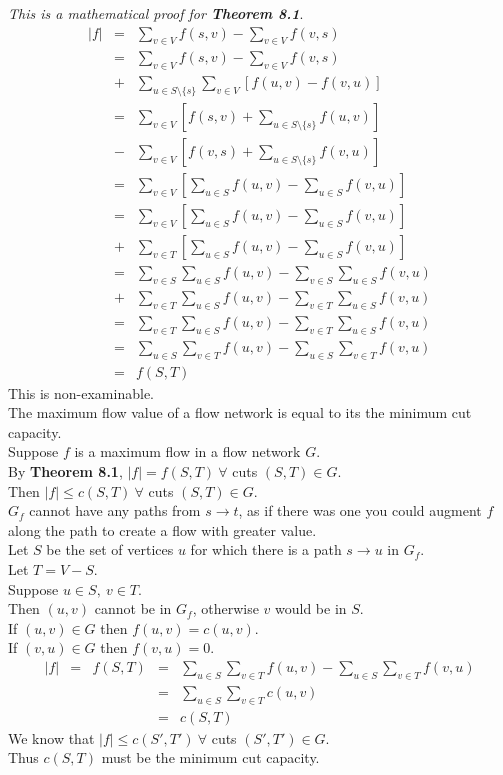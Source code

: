 \documentclass[11pt,a4paper]{article}
\begin{document}
\textit{This is a mathematical proof for \textbf{Theorem 8.1}}.
\[\begin{array}{rcl}
|f|&=&\sum_{v\in V}f(s,v)-\sum_{v\in V}f(v,s)\\
&=&\sum_{v\in V}f(s,v)-\sum_{v\in V}f(v,s)\\
&+&\sum_{u\in S\setminus\{s\}}\sum_{v\in V}[f(u,v)-f(v,u)]\\
&=&\sum_{v\in V}[f(s,v)+\sum_{u\in S\setminus\{s\}}f(u,v)]\\
&-&\sum_{v\in V}[f(v,s)+\sum_{u\in S\setminus\{s\}}f(v,u)]\\
&=&\sum_{v\in V}[\sum_{u\in S}f(u,v)-\sum_{u\in S}f(v,u)]\\
&=&\sum_{v\in V}[\sum_{u\in S}f(u,v)-\sum_{u\in S}f(v,u)]\\
&+&\sum_{v\in T}[\sum_{u\in S}f(u,v)-\sum_{u\in S}f(v,u)]\\
&=&\sum_{v\in S}\sum_{u\in S}f(u,v)-\sum_{v\in S}\sum_{u\in S}f(v,u)\\
&+&\sum_{v\in T}\sum_{u\in S}f(u,v)-\sum_{v\in T}\sum_{u\in S}f(v,u)\\
&=&\sum_{v\in T}\sum_{u\in S}f(u,v)-\sum_{v\in T}\sum_{u\in S}f(v,u)\\
&=&\sum_{u\in S}\sum_{v\in T}f(u,v)-\sum_{u\in S}\sum_{v\in T}f(v,u)\\
&=&f(S,T)
\end{array}\]
\nb This is non-examinable.\\

The maximum flow value of a flow network is equal to its the minimum cut capacity.\\

Suppose $f$ is a maximum flow in a flow network $G$.\\
By \textbf{Theorem 8.1}, $|f|=f(S,T)\ \forall$ cuts $(S,T)\in G$.\\
Then $|f|\leq c(S,T)\ \forall$ cuts $(S,T)\in G$.\\
$G_f$ cannot have any paths from $s\to t$, as if there was one you could augment $f$ along the path to create a flow with greater value.\\
Let $S$ be the set of vertices $u$ for which there is a path $s\to u$ in $G_f$.\\
Let $T=V-S$.\\
Suppose $u\in S,\ v\in T$.\\
Then $(u,v)$ cannot be in $G_f$, otherwise $v$ would be in $S$.\\
If $(u,v)\in G$ then $f(u,v)=c(u,v)$.\\
If $(v,u)\in G$ then $f(v,u)=0$.\\
\[\begin{array}{rcccl}
|f|&=&f(S,T)&=&\sum_{u\in S}\sum_{v\in T}f(u,v)-\sum_{u\in S}\sum_{v\in T}f(v,u)\\
&&&=&\sum_{u\in S}\sum_{v\in T}c(u,v)\\
&&&=&c(S,T)
\end{array}\]
We know that $|f|\leq c(S',T')\ \forall$ cuts $(S',T')\in G$.\\
Thus $c(S,T)$ must be the minimum cut capacity.\\ 
\end{document}
